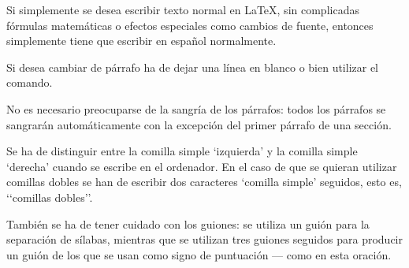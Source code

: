 \documentclass[a4paper,10pt]{letter}
\begin{document}
 Si simplemente se desea escribir texto normal en LaTeX,
 sin complicadas f\'ormulas matem\'aticas o efectos especiales
 como cambios de fuente, entonces simplemente tiene que escribir
 en espa\~nol normalmente.\par
 Si desea cambiar de párrafo ha de dejar una línea en blanco o bien
 utilizar el comando.\par
 No es necesario preocuparse de la sangría de los párrafos:
 todos los párrafos se sangrarán automáticamente con la excepción
 del primer párrafo de una sección.

 Se ha de distinguir entre la comilla simple ‘izquierda’
 y la comilla simple ‘derecha’ cuando se escribe en el ordenador.
 En el caso de que se quieran utilizar comillas dobles se han de
 escribir dos caracteres ‘comilla simple’ seguidos, esto es,
 ‘‘comillas dobles’’.

 También se ha de tener cuidado con los guiones: se utiliza un 
 guión para la separación de sílabas, mientras que se utilizan
 tres guiones seguidos para producir un guión de los que se usan
como signo de puntuación --- como en esta oración.
\end{document}
